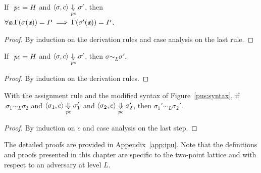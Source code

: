 \begin{myLemma}[Evolution]
\label{lem:evol}
  If $~\mathit{pc} = H$ and $\langle \sigma, c \rangle \underset{\mathit{pc}}{\Downarrow} \sigma'$, then
  \\ $\forall \emph{\texttt{x}}.\Gamma(\sigma(\emph{\texttt{x}})) = P
  \implies \Gamma(\sigma'(\emph{\texttt{x}})) = P$. 
\end{myLemma}
\begin{proof} By induction on the derivation rules and case
  analysis on the last rule.
\end{proof}

\begin{myLemma}
\label{lem:conf}
  If $~\mathit{pc} = H$ and $\langle \sigma, c \rangle
  \underset{\mathit{pc}}{\Downarrow} \sigma' $, then $\sigma \sim_L \sigma'$.
\end{myLemma}
\begin{proof} By induction on the derivation rules.
\end{proof}

\begin{myThm}
  With the assignment rule  and the modified syntax of
  Figure~\ref{pus:syntax}, if 
  $~\sigma_1 \sim_L \sigma_2$ and $\langle \sigma_1, c \rangle
  \underset{\mathit{pc}}{\Downarrow} \sigma_1' $ and $\langle \sigma_2, c
  \rangle\underset{\mathit{pc}}{\Downarrow} \sigma_2' $, then $\sigma_1' \sim_L
  \sigma_2'$.
\end{myThm}
\begin{proof} By induction on $c$ and case
  analysis on the last step.
\end{proof}

The detailed proofs are provided in Appendix~\ref{app:ipu}. 
Note that the definitions and proofs presented in this chapter are
specific to the two-point lattice and with respect to an adversary at
level $L$. 

